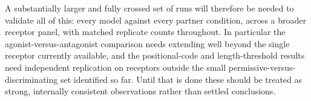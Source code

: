 \documentclass[11pt,a4paper]{article}
\begin{document}
A substantially larger and fully crossed set of runs will therefore be needed to validate all of
this: every model against every partner condition, across a broader receptor panel, with matched
replicate counts throughout. In particular the agonist-versus-antagonist comparison needs extending
well beyond the single receptor currently available, and the positional-code and length-threshold
results need independent replication on receptors outside the small permissive-versus-discriminating
set identified so far. Until that is done these should be treated as strong, internally consistent
observations rather than settled conclusions.
\end{document}
